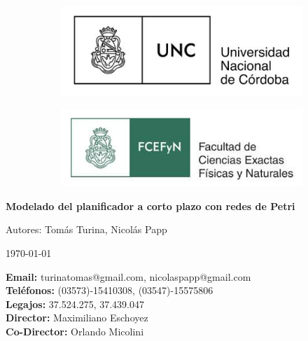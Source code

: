 \documentclass[a4paper]{book}
\def\frontmatter{%
 \setcounter{section}{0}
 \pagenumbering{gobble}
}%
\begin{document}
\frontmatter

\begin{titlepage}
	\begin{figure}[t]
		\centering
    	\begin{subfigure}[b]{0.49\textwidth}
            \includegraphics[width=\textwidth]{./imagenes/UNC.PNG}
        	\label{fig:UNC}
    	\end{subfigure}
    	\begin{subfigure}[b]{0.49\textwidth}
            \includegraphics[width=\textwidth]{./imagenes/FCEFYN.PNG}
        	\label{fig:FCEFYN}
    	\end{subfigure}
	\end{figure}

	\begin{huge}
		\begin{center}
			\textbf{Modelado del planificador a corto plazo con redes de Petri}
		\end{center}
	\end{huge}
	\vspace{1.5cm}
	\begin{large}
		\begin{center}
			Autores: Tom\'as Turina, Nicol\'as Papp
		\end{center}
	\end{large}
	\begin{center}
	\begin{large}
		\today\\
	\end{large}
	\vspace{0.5cm}
	\textbf{Email:} turinatomas@gmail.com, nicolaspapp@gmail.com\\
	\vspace{1.5cm}
	\textbf{Teléfonos:} (03573)-15410308, (03547)-15575806 \\
	\vspace{0.2cm}
	\textbf{Legajos: } 37.524.275, 37.439.047\\
	\vspace{1.5cm}
	\textbf{Director:} Maximiliano Eschoyez \\
	\textbf{Co-Director:} Orlando Micolini \\
	\end{center}
\end{titlepage}
\end{document}
